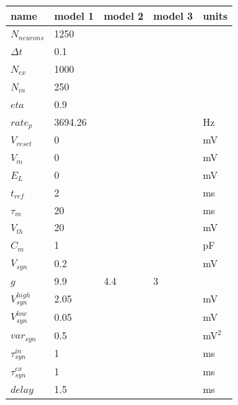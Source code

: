 \documentclass[11pt]{article}
\begin{document}
\begin{table}
\centering
\begin{tabular}{lllll}
\toprule
name &    model 1 &    model 2 &    model 3 &       units \\
\midrule
$N_{neurons}$         &       1250 &        &        &             \\
$\Delta t$            &        0.1 &         &         &             \\
$N_{ex}$              &       1000 &        &        &             \\
$N_{in}$              &        250 &         &         &             \\
$eta$                 &        0.9 &         &         &             \\
$rate_{p}$            &    3694.26 &          &     &          Hz \\
$V_{reset}$           &          0 &           &           &          mV \\
$V_{m}$               &          0 &           &           &          mV \\
$E_{L}$               &          0 &           &           &          mV \\
$t_{ref}$             &          2 &           &           &          ms \\
$\tau_{m}$            &         20 &          &          &          ms \\
$V_{th}$              &         20 &          &          &          mV \\
$C_{m}$               &          1 &           &           &          pF \\
$V_{syn}$             &        0.2 &         &        &          mV \\
$g$                   &        9.9 &        4.4 &          3 &             \\
$V_{syn}^{high}$      &       2.05 &        &        &          mV \\
$V_{syn}^{low}$       &       0.05 &        &       &          mV \\
$var_{syn}$           &        0.5 &         &         &      mV$^2$ \\
$\tau_{syn}^{in}$     &          1 &           &           &          ms \\
$\tau_{syn}^{ex}$     &          1 &           &           &          ms \\
$delay$               &        1.5 &         &        &          ms \\

\end{tabular}
\end{table}
\end{document}

